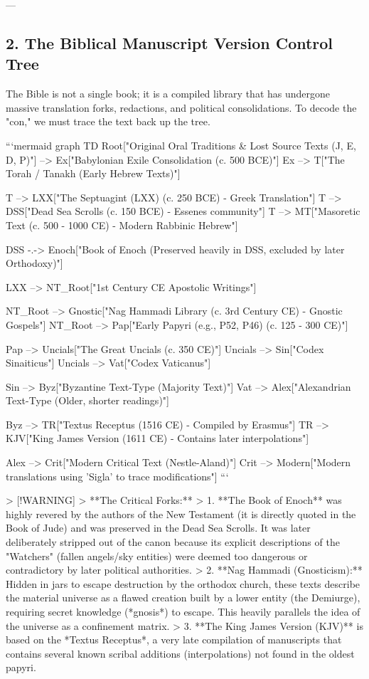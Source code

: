 \documentclass[aps,prd,11pt,onecolumn,superscriptaddress,nofootinbib,floatfix]{revtex4-2}
\begin{document}
---


\subsection{2. The Biblical Manuscript Version Control Tree}
The Bible is not a single book; it is a compiled library that has undergone massive translation forks, redactions, and political consolidations. To decode the "con," we must trace the text back up the tree.


```mermaid
graph TD
Root["Original Oral Traditions \& Lost Source Texts (J, E, D, P)"] --> Ex["Babylonian Exile Consolidation (c. 500 BCE)"]
Ex --> T["The Torah / Tanakh (Early Hebrew Texts)"]


T --> LXX["The Septuagint (LXX) (c. 250 BCE) - Greek Translation"]
T --> DSS["Dead Sea Scrolls (c. 150 BCE) - Essenes community"]
T --> MT["Masoretic Text (c. 500 - 1000 CE) - Modern Rabbinic Hebrew"]


DSS -.-> Enoch["Book of Enoch (Preserved heavily in DSS, excluded by later Orthodoxy)"]


LXX --> NT\_Root["1st Century CE Apostolic Writings"]


NT\_Root --> Gnostic["Nag Hammadi Library (c. 3rd Century CE) - Gnostic Gospels"]
NT\_Root --> Pap["Early Papyri (e.g., P52, P46) (c. 125 - 300 CE)"]


Pap --> Uncials["The Great Uncials (c. 350 CE)"]
Uncials --> Sin["Codex Sinaiticus"]
Uncials --> Vat["Codex Vaticanus"]


Sin --> Byz["Byzantine Text-Type (Majority Text)"]
Vat --> Alex["Alexandrian Text-Type (Older, shorter readings)"]


Byz --> TR["Textus Receptus (1516 CE) - Compiled by Erasmus"]
TR --> KJV["King James Version (1611 CE) - Contains later interpolations"]


Alex --> Crit["Modern Critical Text (Nestle-Aland)"]
Crit --> Modern["Modern translations using 'Sigla' to trace modifications"]
```


> [!WARNING]
> **The Critical Forks:**
> 1. **The Book of Enoch** was highly revered by the authors of the New Testament (it is directly quoted in the Book of Jude) and was preserved in the Dead Sea Scrolls. It was later deliberately stripped out of the canon because its explicit descriptions of the "Watchers" (fallen angels/sky entities) were deemed too dangerous or contradictory by later political authorities.
> 2. **Nag Hammadi (Gnosticism):** Hidden in jars to escape destruction by the orthodox church, these texts describe the material universe as a flawed creation built by a lower entity (the Demiurge), requiring secret knowledge (*gnosis*) to escape. This heavily parallels the idea of the universe as a confinement matrix.
> 3. **The King James Version (KJV)** is based on the *Textus Receptus*, a very late compilation of manuscripts that contains several known scribal additions (interpolations) not found in the oldest papyri.
\end{document}
